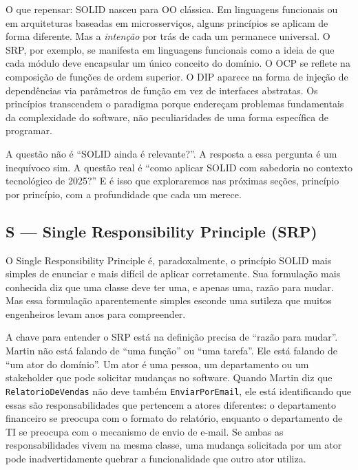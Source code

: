 O que repensar: SOLID nasceu para OO clássica. Em linguagens funcionais ou em
arquiteturas baseadas em microsserviços, alguns princípios se aplicam de forma
diferente. Mas a \emph{intenção} por trás de cada um permanece universal. O SRP,
por exemplo, se manifesta em linguagens funcionais como a ideia de que cada
módulo deve encapsular um único conceito do domínio. O OCP se reflete na
composição de funções de ordem superior. O DIP aparece na forma de injeção de
dependências via parâmetros de função em vez de interfaces abstratas. Os
princípios transcendem o paradigma porque endereçam problemas fundamentais da
complexidade do software, não peculiaridades de uma forma específica de
programar.

A questão não é ``SOLID ainda é relevante?''. A resposta a essa pergunta é
um inequívoco sim. A questão real é ``como aplicar SOLID com sabedoria
no contexto tecnológico de 2025?'' E é isso que exploraremos nas próximas
seções, princípio por princípio, com a profundidade que cada um merece.


\subsection{S --- Single Responsibility Principle (SRP)}

O Single Responsibility Principle é, paradoxalmente, o princípio SOLID mais
simples de enunciar e mais difícil de aplicar corretamente. Sua formulação
mais conhecida diz que uma classe deve ter uma, e apenas uma, razão para
mudar. Mas essa formulação aparentemente simples esconde uma sutileza que
muitos engenheiros levam anos para compreender.

A chave para entender o SRP está na definição precisa de ``razão para mudar''.
Martin não está falando de ``uma função'' ou ``uma tarefa''. Ele está
falando de ``um ator do domínio''. Um ator é uma pessoa, um departamento ou
um stakeholder que pode solicitar mudanças no software. Quando Martin diz que
\texttt{RelatorioDeVendas} não deve também \texttt{EnviarPorEmail}, ele está
identificando que essas são responsabilidades que pertencem a atores diferentes:
o departamento financeiro se preocupa com o formato do relatório, enquanto o
departamento de TI se preocupa com o mecanismo de envio de e-mail. Se ambas as
responsabilidades vivem na mesma classe, uma mudança solicitada por um ator
pode inadvertidamente quebrar a funcionalidade que outro ator utiliza.

